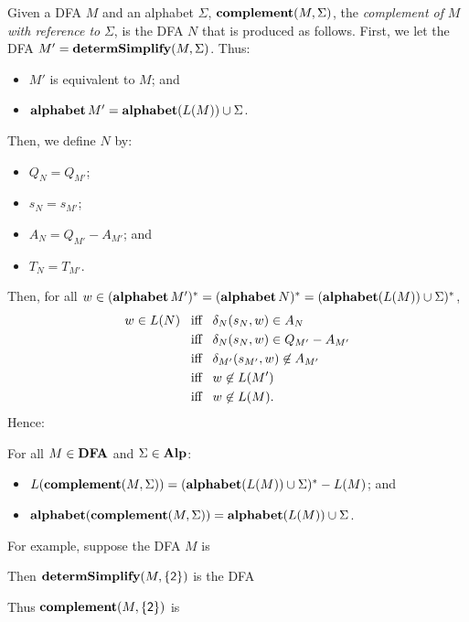 Given a DFA $M$ and an alphabet $\Sigma$, $\mathbf{complement}(M,\Sigma)$,
the \emph{complement of} $M$ \emph{with reference to} $\Sigma$,
is the DFA $N$ that is produced as follows.  First, we let the DFA
$M'=\mathbf{determSimplify}(M,\Sigma)$.  Thus:
\begin{itemize}
\item $M'$ is equivalent to $M$; and

\item $\mathbf{alphabet}\,M' = \mathbf{alphabet}(L(M))\cup\Sigma$.
\end{itemize}
Then, we define $N$ by:
\begin{itemize}
\item $Q_N = Q_{M'}$;

\item $s_N = s_{M'}$;

\item $A_N = Q_{M'} - A_{M'}$; and

\item $T_N = T_{M'}$.
\end{itemize}
Then, for all $w\in(\mathbf{alphabet}\,M')^*=
(\mathbf{alphabet}\,N)^*=(\mathbf{alphabet}(L(M))\cup\Sigma)^*$,
\begin{align*}
w\in L(N) &\mathrel{\;\;\allowbreak\mbox{iff}\allowbreak\;\;} \delta_N(s_N, w)\in A_N \\
&\mathrel{\;\;\allowbreak\mbox{iff}\allowbreak\;\;} \delta_N(s_N, w)\in Q_{M'}-A_{M'} \\
&\mathrel{\;\;\allowbreak\mbox{iff}\allowbreak\;\;} \delta_{M'}(s_{M'}, w)\not\in A_{M'} \\
&\mathrel{\;\;\allowbreak\mbox{iff}\allowbreak\;\;} w\not\in L(M') \\
&\mathrel{\;\;\allowbreak\mbox{iff}\allowbreak\;\;} w\not\in L(M) .
\end{align*}
Hence:

\begin{theorem}
For all $M\in\mathbf{DFA}$ and $\Sigma\in\mathbf{Alp}$:
\begin{itemize}
\item $L(\mathbf{complement}(M,\Sigma)) = (\mathbf{alphabet}(L(M))\cup\Sigma)^*-L(M)$; and

\item $\mathbf{alphabet}(\mathbf{complement}(M,\Sigma)) = \mathbf{alphabet}(L(M))\cup\Sigma$.
\end{itemize}
\end{theorem}

For example, suppose the DFA $M$ is
\begin{center}

\end{center}
Then $\mathbf{determSimplify}(M,\{\mathsf{2}\})$ is the DFA
\begin{center}

\end{center}
Thus $\mathbf{complement}(M,\{\mathsf{2}\})$ is
\begin{center}

\end{center}

